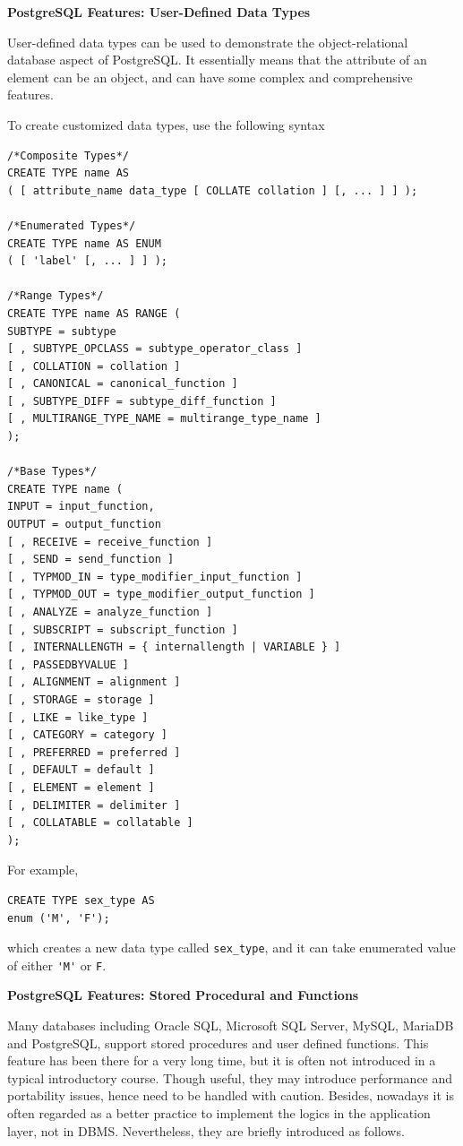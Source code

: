 \vspace{0.1in}
\noindent \textbf{PostgreSQL Features: User-Defined Data Types}
\vspace{0.1in}

User-defined data types can be used to demonstrate the object-relational database aspect of PostgreSQL. It essentially means that the attribute of an element can be an object, and can have some complex and comprehensive features.

To create customized data types, use the following syntax
\begin{lstlisting}
/*Composite Types*/
CREATE TYPE name AS
( [ attribute_name data_type [ COLLATE collation ] [, ... ] ] );

/*Enumerated Types*/
CREATE TYPE name AS ENUM
( [ 'label' [, ... ] ] );

/*Range Types*/
CREATE TYPE name AS RANGE (
SUBTYPE = subtype
[ , SUBTYPE_OPCLASS = subtype_operator_class ]
[ , COLLATION = collation ]
[ , CANONICAL = canonical_function ]
[ , SUBTYPE_DIFF = subtype_diff_function ]
[ , MULTIRANGE_TYPE_NAME = multirange_type_name ]
);

/*Base Types*/
CREATE TYPE name (
INPUT = input_function,
OUTPUT = output_function
[ , RECEIVE = receive_function ]
[ , SEND = send_function ]
[ , TYPMOD_IN = type_modifier_input_function ]
[ , TYPMOD_OUT = type_modifier_output_function ]
[ , ANALYZE = analyze_function ]
[ , SUBSCRIPT = subscript_function ]
[ , INTERNALLENGTH = { internallength | VARIABLE } ]
[ , PASSEDBYVALUE ]
[ , ALIGNMENT = alignment ]
[ , STORAGE = storage ]
[ , LIKE = like_type ]
[ , CATEGORY = category ]
[ , PREFERRED = preferred ]
[ , DEFAULT = default ]
[ , ELEMENT = element ]
[ , DELIMITER = delimiter ]
[ , COLLATABLE = collatable ]
);
\end{lstlisting}
For example,
\begin{lstlisting}
CREATE TYPE sex_type AS
enum ('M', 'F');
\end{lstlisting}
which creates a new data type called \verb|sex_type|, and it can take enumerated value of either \verb|'M'| or \verb|F|. 

\vspace{0.1in}
\noindent \textbf{PostgreSQL Features: Stored Procedural and Functions}
\vspace{0.1in}

Many databases including Oracle SQL, Microsoft SQL Server, MySQL, MariaDB and PostgreSQL, support stored procedures and user defined functions. This feature has been there for a very long time, but it is often not introduced in a typical introductory course. Though useful, they may introduce performance and portability issues, hence need to be handled with caution. Besides, nowadays it is often regarded as a better practice to implement the logics in the application layer, not in DBMS. Nevertheless, they are briefly introduced as follows.

